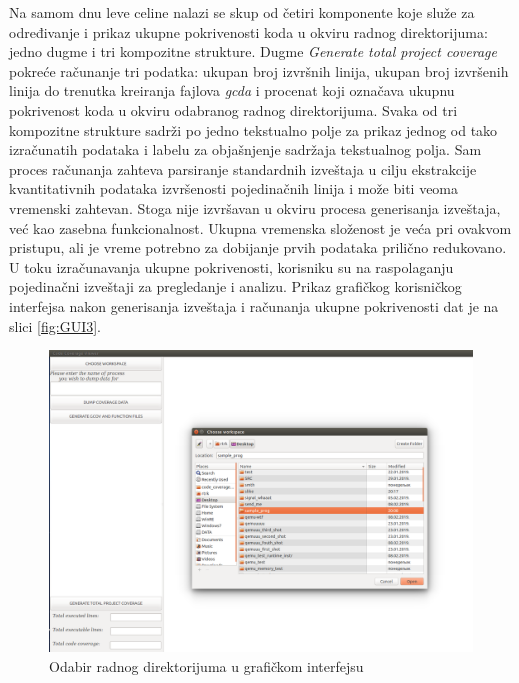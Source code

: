 \documentclass[12pt,oneside]{memoir}
\newcommand{\strano}[1]{\textit{#1}}
\begin{document}
Na samom dnu leve celine nalazi se skup od četiri komponente koje služe za određivanje i prikaz ukupne pokrivenosti koda u okviru radnog direktorijuma: jedno dugme i tri kompozitne strukture. Dugme \strano{Generate total project coverage} pokreće računanje tri podatka: ukupan broj izvršnih linija, ukupan broj izvršenih linija do trenutka kreiranja fajlova \strano{gcda} i procenat koji označava ukupnu pokrivenost koda u okviru odabranog radnog direktorijuma. Svaka od tri kompozitne strukture sadrži po jedno tekstualno polje za prikaz jednog od tako izračunatih podataka i labelu za objašnjenje sadržaja tekstualnog polja. Sam proces računanja zahteva parsiranje standardnih izveštaja u cilju ekstrakcije kvantitativnih podataka izvršenosti pojedinačnih linija i može biti veoma vremenski zahtevan. Stoga nije izvršavan u okviru procesa generisanja izveštaja, već kao zasebna funkcionalnost. Ukupna vremenska složenost je veća pri ovakvom pristupu, ali je vreme potrebno za dobijanje prvih podataka prilično redukovano. U toku izračunavanja ukupne pokrivenosti, korisniku su na raspolaganju pojedinačni izveštaji za pregledanje i analizu. Prikaz grafičkog korisničkog interfejsa nakon generisanja izveštaja i računanja ukupne pokrivenosti dat je na slici \ref{fig:GUI3}.

\begin{figure}[!ht]
  \centering
  \includegraphics[width=\textwidth]{img/GUI_2.png}
  \caption{Odabir radnog direktorijuma u grafičkom interfejsu}
  \label{fig:GUI2}
\end{figure}
\end{document}
